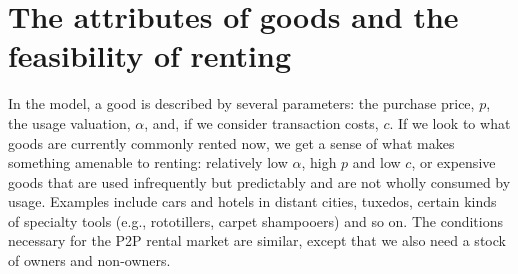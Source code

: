 \documentclass[11pt]{article}
\begin{document}



\section{The attributes of goods and the feasibility of renting} 
In the model, a good is described by several parameters: the purchase price, $p$, the usage valuation, $\alpha$, and, if we consider transaction costs, $c$.  
If we look to what goods are currently commonly rented now, we get a sense of what makes something amenable to renting: 
relatively low $\alpha$, high $p$ and low $c$, or expensive goods that are used infrequently but predictably and are not wholly consumed by usage. 
Examples include cars and hotels in distant cities, tuxedos, certain kinds of specialty tools (e.g., rototillers, carpet shampooers) and so on. 
The conditions necessary for the P2P rental market are similar, except that we also need a stock of owners and non-owners. 
\end{document}
